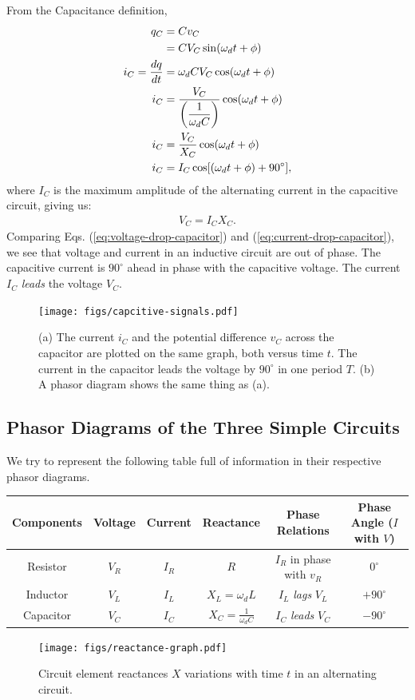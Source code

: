 \documentclass[12pt,b4paper]{article}
\begin{document}
From the Capacitance definition,
\begin{align}
    q_C&=Cv_C\notag\\
    &=CV_C\sin(\omega_d t+\phi)\notag\\
    i_C=\frac{dq}{dt}&=\omega_dCV_C\cos(\omega_d t+\phi)\notag\\
    i_C&=\frac{V_C}{\left(\displaystyle\frac{1}{\omega_dC}\right)}\cos(\omega_d t+\phi)\notag\\
    i_C&=\frac{V_C}{X_C}\cos(\omega_d t+\phi)\notag\\
    i_C&=I_C\cos[(\omega_d t+\phi)+90^\circ],\label{eq:current-drop-capacitor}
\end{align}
where $I_C$ is the maximum amplitude of the alternating current in the capacitive circuit, giving us:
\begin{align}
    V_C=I_CX_C.
\end{align}
Comparing Eqs. (\ref{eq:voltage-drop-capacitor}) and (\ref{eq:current-drop-capacitor}), we see that voltage and current in an inductive circuit are out of phase. The capacitive current is $90^\circ$ ahead in phase with the capacitive voltage. The current $I_C$ \textit{leads} the voltage $V_C$.
\begin{figure}[H]
    \centering
    \texttt{[image: figs/capcitive-signals.pdf]}
    \caption{(a) The current $i_C$ and the potential difference $v_C$ across the capacitor are plotted on the same graph, both versus time $t$. The current in the capacitor leads the voltage by $90^\circ$ in one period $T$. (b) A phasor diagram shows the same thing as (a).}
    \label{fig:capcitive-signals}
\end{figure}
\subsection{Phasor Diagrams of the Three Simple Circuits}
We try to represent the following table full of information in their respective phasor diagrams.
\begin{table}[H]
    \centering
    \begin{tabular}{c|c|c|c|c|c}
        Components & Voltage & Current & Reactance & Phase Relations & Phase Angle ($I$ with $V$)\\\hline
        Resistor & $V_R$ & $I_R$ & $R$ & $I_R$ in phase with $v_R$ & $0^\circ$ \\[6pt]\hline
        Inductor & $V_L$ & $I_L$ & $X_L=\omega_dL$ & $I_L$ \textit{lags} $V_L$ & $+90^\circ$ \\[6pt]\hline
        Capacitor & $V_C$ & $I_C$ & $\displaystyle X_C=\frac{1}{\omega_dC}$ & $I_C$ \textit{leads} $V_C$ & $-90^\circ$ \\\hline 
    \end{tabular}
    \label{tab:phasor-info}
\end{table}
\begin{figure}[H]
    \centering
    \texttt{[image: figs/reactance-graph.pdf]}
    \caption{Circuit element reactances $X$ variations with time $t$ in an alternating circuit.}
    \label{fig:reactance-graph}
\end{figure}
\end{document}
